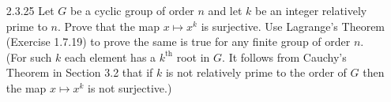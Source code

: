 \begin{enumerate}
      \begin{enumerate}
         \item Let $g \in N_G(\cyc{x})$. It follows by definition that
               $g\cyc{x}g^{-1} = \cyc{x}$. Since $gxg^{-1} \in g\cyc{x}g^{-1}$,
               it follows that $gxg^{-1} \in \cyc{x}$, so that $gxg^{-1} = x^a$
               for some $a \in \Z$.
         \item Suppose $gxg^{-1} = x^a$ for some integer $a$. Let
               $y \in g\cyc{x}g^{-1}$, so that $y = gx^ig^{-1}$ for some integer
               $i$. By Lemma \ref{1_1_22_1}, we have that
               $(gx^ig^{-1}) = (gxg^{-1})^i = x^{ai} \in \cyc{x}$, so that
               $g\cyc{x}g^{-1} \subseteq \cyc{x}$. Since $G$ is finite, we let
               $|x| = n$. Exercise 1.1.22 says that
               $|gxg^{-1}| = |x| = n$; that is,
               $$n = |x| = |\cyc{x}| = |gxg^{-1}| = |\cyc{gxg^{-1}}| =
                 |g\cyc{x}g^{-1}|.$$
               Conclude that $g\cyc{x}g^{-1} = \cyc{x}$, and thus,
               $g \in N_G(\cyc{x})$.
      \end{enumerate} \qed
   \item[2.3.25]  Let $G$ be a cyclic group of order $n$ and let $k$ be an
                  integer relatively prime to $n$. Prove that the map
                  $x \mapsto x^k$ is surjective. Use Lagrange's Theorem
                  (Exercise 1.7.19) to prove the same is true for any finite
                  group of order $n$. (For such $k$ each element has a
                  $k^{\text{th}}$ root in $G$. It follows from Cauchy's Theorem
                  in Section 3.2 that if $k$ is not relatively prime to the
                  order of $G$ then the map $x \mapsto x^k$ is not surjective.)


\end{enumerate}
